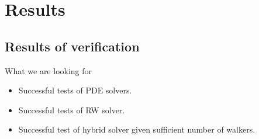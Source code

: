 \documentclass[12pt,a4paper, xcolor={usenames,dvipsnames,svgnames,table}]{beamer}
\begin{document}
\section{Results}
\subsection{Results of verification}
\begin{frame}[shrink]{What we are looking for}
\begin{itemize}
 \item Successful tests of PDE solvers.
 \item Successful tests of RW solver.
 \item Successful test of hybrid solver given sufficient number of walkers.
\end{itemize}

\end{frame}
\notetoself{}
\end{document}
